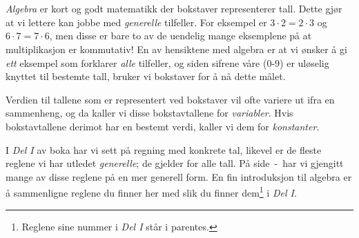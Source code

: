 


\section{\algintro}
\textit{Algebra} er kort og godt matematikk der bokstaver representerer tall. Dette gjør at vi lettere kan jobbe med \textsl{generelle} tilfeller. For eksempel er $ {3\cdot 2=2\cdot3} $ og $ 6\cdot7=7\cdot6 $, men disse er bare to av de uendelig mange eksemplene på at multiplikasjon er kommutativ! En av hensiktene med algebra er at vi ønsker å gi \textsl{ett} eksempel som forklarer \textsl{alle} tilfeller, og siden sifrene våre (0-9) er uløselig knyttet til bestemte tall, bruker vi bokstaver for å nå dette målet. \vsk

Verdien til tallene som er representert ved bokstaver vil ofte variere ut ifra en sammenheng, og da kaller vi disse bokstavtallene for \textit{variabler}. Hvis bokstavtallene derimot har en bestemt verdi, kaller vi dem for \textit{konstanter}.

\vsk

I \textsl{Del I} av boka har vi sett på regning med konkrete tal, likevel er de fleste reglene vi har utledet \textsl{generelle}; de gjelder for alle tall. På side \pageref{regstart}\,-\,\pageref{regslutt} har vi gjengitt mange av disse reglene på en mer generell form. En fin introduksjon til algebra er å sammenligne reglene du finner her med slik du finner dem\footnote{Reglene sine nummer i \textsl{Del I} står i parentes.} i \textsl{Del I}. \vsk

\regv
\label{regstart}
\reg[\adkom\;(\ref{adkom}) \label{adkomalg}]{\vs
\[ a+ b =b+a \]
}
\eks{ \vsb
\[ 7+ 5=5+7 \]
} \vsk \vsk

\reg[\gangkom\;(\ref{gangkom})]{\vs
	\[ a\cdot b =b\cdot a \]
}
\eks[1]{ \vsb
	\[ 9\cdot 8=8\cdot9 \]
}
\eks[2]{ \vsb
\[  8\cdot a= a\cdot 8  \]
}
\newpage
{}
\vsk 

\reg[\brdef\;(\ref{brdef})]{
\[ a:b=\frac{a}{b} \]
}
\eks[]{ \vs
\[a:2= \frac{a}{2} \]
}
 \vsk 

